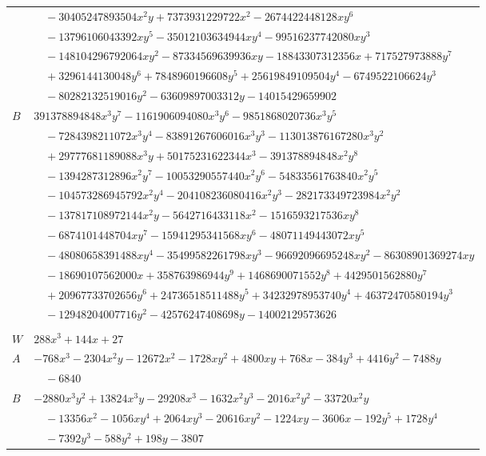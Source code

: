 \documentclass[11pt]{article}
\begin{document}
\begin{longtable}{@{}ll@{}}
 & $\quad -30405247893504x^{2}y+7373931229722x^{2}-2674422448128xy^{6}$\\
 & $\quad -13796106043392xy^{5}-35012103634944xy^{4}-99516237742080xy^{3}$\\
 & $\quad -148104296792064xy^{2}-87334569639936xy-18843307312356x+717527973888y^{7}$\\
 & $\quad +3296144130048y^{6}+7848960196608y^{5}+25619849109504y^{4}-6749522106624y^{3}$\\
 & $\quad -80282132519016y^{2}-63609897003312y-14015429659902$\\
$B$ & $391378894848x^{3}y^{7}-1161906094080x^{3}y^{6}-9851868020736x^{3}y^{5}$\\
 & $\quad -7284398211072x^{3}y^{4}-83891267606016x^{3}y^{3}-113013876167280x^{3}y^{2}$\\
 & $\quad +29777681189088x^{3}y+50175231622344x^{3}-391378894848x^{2}y^{8}$\\
 & $\quad -1394287312896x^{2}y^{7}-10053290557440x^{2}y^{6}-54833561763840x^{2}y^{5}$\\
 & $\quad -104573286945792x^{2}y^{4}-204108236080416x^{2}y^{3}-282173349723984x^{2}y^{2}$\\
 & $\quad -137817108972144x^{2}y-5642716433118x^{2}-1516593217536xy^{8}$\\
 & $\quad -6874101448704xy^{7}-15941295341568xy^{6}-48071149443072xy^{5}$\\
 & $\quad -48080658391488xy^{4}-35499582261798xy^{3}-96692096695248xy^{2}-86308901369274xy$\\
 & $\quad -18690107562000x+358763986944y^{9}+1468690071552y^{8}+4429501562880y^{7}$\\
 & $\quad +20967733702656y^{6}+24736518511488y^{5}+34232978953740y^{4}+46372470580194y^{3}$\\
 & $\quad -12948204007716y^{2}-42576247408698y-14002129573626$\\
\addlinespace[3pt]
\multicolumn{2}{@{}l}{$i=16$, $m=24$, neighbours $8,11,15,63,68$}\\
$W$ & $288x^{3}+144x+27$\\
$A$ & $-768x^{3}-2304x^{2}y-12672x^{2}-1728xy^{2}+4800xy+768x-384y^{3}+4416y^{2}-7488y$\\
 & $\quad -6840$\\
$B$ & $-2880x^{3}y^{2}+13824x^{3}y-29208x^{3}-1632x^{2}y^{3}-2016x^{2}y^{2}-33720x^{2}y$\\
 & $\quad -13356x^{2}-1056xy^{4}+2064xy^{3}-20616xy^{2}-1224xy-3606x-192y^{5}+1728y^{4}$\\
 & $\quad -7392y^{3}-588y^{2}+198y-3807$\\

\end{longtable}
\end{document}
